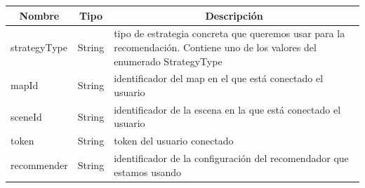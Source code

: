 \begin{table}[H]
	\centering
	\label{my-label}
	\begin{tabular}{|l|l|p{6cm}|}
		\hline
		\multicolumn{1}{|c|}{\textbf{Nombre}} & \multicolumn{1}{c|}{\textbf{Tipo}} & \multicolumn{1}{c|}{\textbf{Descripción}}                                                                                                                                                                                                                                                                                                               \\ \hline
		strategyType                          & String                             & tipo de estrategia concreta que queremos usar para la recomendación. Contiene uno de los valores del enumerado StrategyType                                                                                                                                                                                                                             \\ \hline
		mapId                                 & String                             & identificador del map en el que está conectado el usuario                                                                                                                                                                                                                                                                                               \\ \hline
		sceneId                               & String                             & identificador de la escena en la que está conectado el usuario                                                                                                                                                                                                                                                                                          \\ \hline
		token                                 & String                             & token del usuario conectado                                                                                                                                                                                                                                                                                                                             \\ \hline
		recommender                           & String                             & identificador de la configuración del recomendador que estamos usando                                                                                                                                                                                                                                                                                   \\ \hline

\end{tabular}
\end{table}
